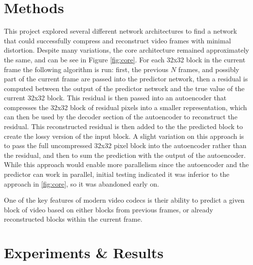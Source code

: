 \documentclass[10pt,twocolumn,letterpaper]{article}
\begin{document}
\section{Methods}
This project explored several different network architectures to find a network that could successfully compress and reconstruct video frames with minimal distortion. Despite many variations, the core architecture remained approximately the same, and can be see in Figure \ref{fig:core}. For each 32x32 block in the current frame the following algorithm is run: first, the previous $N$ frames, and possibly part of the current frame are passed into the predictor network, then a residual is computed between the output of the predictor network and the true value of the current 32x32 block. This residual is then passed into an autoencoder that compresses the 32x32 block of residual pixels into a smaller representation, which can then be used by the decoder section of the autoencoder to reconstruct the residual. This reconstructed residual is then added to the the predicted block to create the lossy version of the input block. A slight variation on this approach is to pass the full uncompressed 32x32 pixel block into the autoencoder rather than the residual, and then to sum the prediction with the output of the autoencoder. While this approach would enable more parallelism since the autoencoder and the predictor can work in parallel, initial testing indicated it was inferior to the approach in \ref{fig:core}, so it was abandoned early on.

One of the key features of modern video codecs is their ability to predict a given block of video based on either blocks from previous frames, or already reconstructed blocks within the current frame. 

\section{Experiments \& Results}

{\small


}
\end{document}
